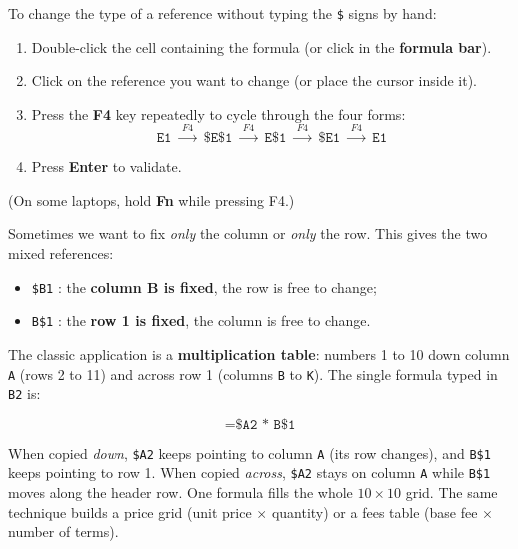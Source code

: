 \documentclass[11pt]{article}
\newcommand{\cle}[1]{{\popxbold\color{popdark}#1}}
\newcounter{popsec}
\newcounter{popsub}
\newcommand{\courssub}[1]{%
  \stepcounter{popsub}%
  \par\vspace{9pt}\noindent{\popxbold\fontsize{11.5}{13}\selectfont\color{popink}{\color{poporange}\thepopsec.\thepopsub}\hspace{6pt}#1}\par\nopagebreak\vspace{4pt}
}
\begin{document}
\begin{methode}
To change the type of a reference without typing the \texttt{\$} signs by hand:
\begin{enumerate}
\item Double-click the cell containing the formula (or click in the \textbf{formula bar}).
\item Click on the reference you want to change (or place the cursor inside it).
\item Press the \textbf{F4} key repeatedly to cycle through the four forms:
\[ \texttt{E1} \;\xrightarrow{\;F4\;}\; \texttt{\$E\$1} \;\xrightarrow{\;F4\;}\; \texttt{E\$1} \;\xrightarrow{\;F4\;}\; \texttt{\$E1} \;\xrightarrow{\;F4\;}\; \texttt{E1} \]
\item Press \textbf{Enter} to validate.
\end{enumerate}
(On some laptops, hold \textbf{Fn} while pressing F4.)
\end{methode}

\courssub{Mixed Referencing}

Sometimes we want to fix \emph{only} the column or \emph{only} the row. This gives the two \cle{mixed references}:

\begin{itemize}
\item \texttt{\$B1} : the \textbf{column B is fixed}, the row is free to change;
\item \texttt{B\$1} : the \textbf{row 1 is fixed}, the column is free to change.
\end{itemize}

The classic application is a \textbf{multiplication table}: numbers 1 to 10 down column \texttt{A} (rows 2 to 11) and across row 1 (columns \texttt{B} to \texttt{K}). The single formula typed in \texttt{B2} is:

\[ \texttt{=\$A2 * B\$1} \]

When copied \emph{down}, \texttt{\$A2} keeps pointing to column \texttt{A} (its row changes), and \texttt{B\$1} keeps pointing to row 1. When copied \emph{across}, \texttt{\$A2} stays on column \texttt{A} while \texttt{B\$1} moves along the header row. One formula fills the whole $10 \times 10$ grid. The same technique builds a price grid (unit price $\times$ quantity) or a fees table (base fee $\times$ number of terms).
\end{document}

